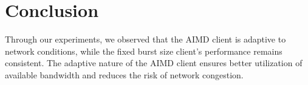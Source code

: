 \documentclass[12pt]{article}
\begin{document}
\clearpage
\section{Conclusion}
Through our experiments, we observed that the AIMD client is adaptive to network conditions, while the fixed burst size client's performance remains consistent. The adaptive nature of the AIMD client ensures better utilization of available bandwidth and reduces the risk of network congestion.
\end{document}
